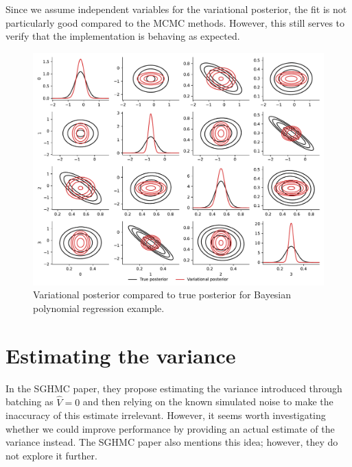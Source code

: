 Since we assume independent variables for the variational posterior, the fit is not particularly good compared to the MCMC methods. 
However, this still serves to verify that the implementation is behaving as expected.
\begin{figure}[htbp]
    \centering
    \includegraphics[width=\linewidth]{Figures/vi-simulated.pdf}
    \caption{Variational posterior compared to true posterior for Bayesian polynomial regression example.}
    \label{fig:vi-simulated}
\end{figure}


\section{Estimating the variance}

In the SGHMC paper, they propose estimating the variance introduced through batching as $\hat{V}=0$ and then relying on the known simulated noise to make the inaccuracy of this estimate irrelevant. 
However, it seems worth investigating whether we could improve performance by providing an actual estimate of the variance instead. 
The SGHMC paper also mentions this idea; however, they do not explore it further. 

